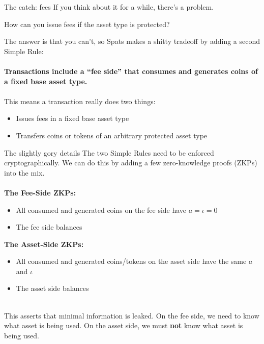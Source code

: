 \documentclass[aspectratio=169]{beamer}
\begin{document}
\begin{frame}{The catch: fees}
	If you think about it for a while, there's a problem.

	\begin{center}
		\alert{How can you issue fees if the asset type is protected?}
	\end{center}

	The answer is that you can't, so Spats makes a shitty tradeoff by adding a second Simple Rule: \\~\\

	\textbf{Transactions include a ``fee side'' that consumes and generates coins of a fixed base asset type.} \\~\\

	This means a transaction really does two things:
	\begin{itemize}
		\item Issues fees in a fixed base asset type
		\item Transfers coins or tokens of an arbitrary protected asset type
	\end{itemize}
\end{frame}

\begin{frame}{The slightly gory details}
	The two Simple Rules need to be enforced cryptographically.
	We can do this by adding a few zero-knowledge proofs (ZKPs) into the mix. \\~\\

	\textbf{The Fee-Side ZKPs:}
	\begin{itemize}
		\item All consumed and generated coins on the fee side have $a = \iota = 0$
		\item The fee side balances
	\end{itemize}

	\textbf{The Asset-Side ZKPs:}
	\begin{itemize}
		\item All consumed and generated coins/tokens on the asset side have the same $a$ and $\iota$
		\item The asset side balances \\~\\
	\end{itemize}

	This asserts that minimal information is leaked.
	On the fee side, we need to know what asset is being used.
	On the asset side, we must \textbf{not} know what asset is being used.
\end{frame}
\end{document}
